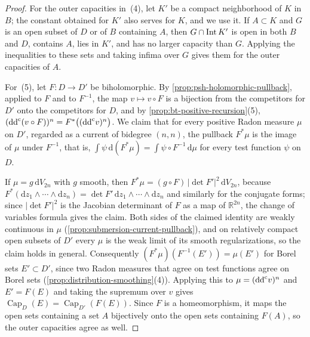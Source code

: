 \begin{proof}
For the outer capacities in~(4), let $K'$ be a compact neighborhood of $K$ in $B$; the constant obtained for $K'$ also serves for $K$, and we use it. If $A\subset K$ and $G$ is an open subset of $D$ or of $B$ containing $A$, then $G\cap\operatorname{Int} K'$ is open in both $B$ and $D$, contains $A$, lies in $K'$, and has no larger capacity than $G$. Applying the inequalities to these sets and taking infima over $G$ gives them for the outer capacities of $A$.

For~(5), let $F\colon D\to D'$ be biholomorphic. By \cref{prop:psh-holomorphic-pullback}, applied to $F$ and to $F^{-1}$, the map $v\mapsto v\circ F$ is a bijection from the competitors for $D'$ onto the competitors for $D$, and by \cref{prop:bt-positive-recursion}(5), $(\mathrm{dd}^{\mathrm{c}}(v\circ F))^n=F^*\bigl((\mathrm{dd}^{\mathrm{c}} v)^n\bigr)$. We claim that for every positive Radon measure $\mu$ on $D'$, regarded as a current of bidegree $(n,n)$, the pullback $F^*\mu$ is the image of $\mu$ under $F^{-1}$, that is, $\int\psi\,\mathrm d(F^*\mu)=\int\psi\circ F^{-1}\,\mathrm d\mu$ for every test function $\psi$ on $D$.

If $\mu=g\,\mathrm dV_{2n}$ with $g$ smooth, then $F^*\mu=(g\circ F)\,|\det F'|^2\,\mathrm dV_{2n}$, because $F^*(\mathrm dz_1\wedge\cdots\wedge\mathrm dz_n)=\det F'\,\mathrm dz_1\wedge\cdots\wedge\mathrm dz_n$ and similarly for the conjugate forms; since $|\det F'|^2$ is the Jacobian determinant of $F$ as a map of $\mathbb R^{2n}$, the change of variables formula gives the claim. Both sides of the claimed identity are weakly continuous in $\mu$ (\cref{prop:submersion-current-pullback}), and on relatively compact open subsets of $D'$ every $\mu$ is the weak limit of its smooth regularizations, so the claim holds in general. Consequently $(F^*\mu)(F^{-1}(E'))=\mu(E')$ for Borel sets $E'\subset D'$, since two Radon measures that agree on test functions agree on Borel sets (\cref{prop:distribution-smoothing}(4)). Applying this to $\mu=(\mathrm{dd}^{\mathrm{c}} v)^n$ and $E'=F(E)$ and taking the supremum over $v$ gives $\operatorname{Cap}_D(E)=\operatorname{Cap}_{D'}(F(E))$. Since $F$ is a homeomorphism, it maps the open sets containing a set $A$ bijectively onto the open sets containing $F(A)$, so the outer capacities agree as well.
\end{proof}

